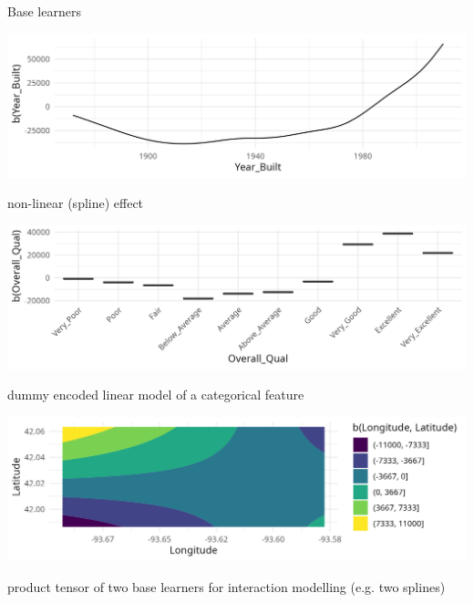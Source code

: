 \documentclass[11pt,compress,t,notes=noshow, xcolor=table]{beamer}
\begin{document}
\begin{vbframe}{Base learners}
\begin{minipage}{0.4\textwidth}
    \includegraphics[width=\linewidth]{figure/compboost-base-learner-spline.png}
\end{minipage}\hfill
\begin{minipage}{0.5\textwidth}
  non-linear (spline) effect
\end{minipage}

\begin{minipage}{0.4\textwidth}
    \includegraphics[width=\linewidth]{figure/compboost-base-learner-ridge.png}
\end{minipage}\hfill
\begin{minipage}{0.5\textwidth}
  dummy encoded linear model of a categorical feature
\end{minipage}

\begin{minipage}{0.4\textwidth}
    \includegraphics[width=\linewidth]{figure/compboost-base-learner-tensor.png}
\end{minipage}\hfill
\begin{minipage}{0.5\textwidth}
  product tensor of two base learners for interaction modelling (e.g. two splines)
\end{minipage}


\end{vbframe}
\end{document}

